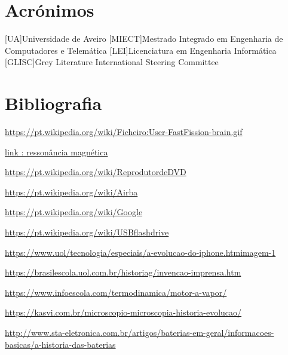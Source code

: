 \documentclass{report}
\begin{document}
\chapter*{Acrónimos}
\begin{acronym}
[UA]{Universidade de Aveiro}
[MIECT]{Mestrado Integrado em Engenharia de Computadores e Telemática}
[LEI]{Licenciatura em Engenharia Informática}
[GLISC]{Grey Literature International Steering Committee}
\end{acronym}


\chapter{Bibliografia}

\printbibliography

\href {https://pt.wikipedia.org/wiki/Ficheiro:User-FastFission-brain.gif}{https://pt.wikipedia.org/wiki/Ficheiro:User-FastFission-brain.gif}

\href {https://pt.wikipedia.org/wiki/Imagem_por_resson\%C3\%A2ncia_magn\%C3\%A9tica}{link : ressonância magnética}

\href {https://pt.wikipedia.org/wiki/Reprodutor_de_DVD}{https://pt.wikipedia.org/wiki/ReprodutordeDVD}

\href {https://pt.wikipedia.org/wiki/Airbag}{https://pt.wikipedia.org/wiki/Airba}

\href {https://pt.wikipedia.org/wiki/Google}{https://pt.wikipedia.org/wiki/Google}

\href {https://pt.wikipedia.org/wiki/USB_flash_drive}{https://pt.wikipedia.org/wiki/USBflashdrive}

\href {https://www.uol/tecnologia/especiais/a-evolucao-do-iphone.htm#imagem-1}{https://www.uol/tecnologia/especiais/a-evolucao-do-iphone.htmimagem-1}

\href {https://brasilescola.uol.com.br/historiag/invencao-imprensa.htm}{https://brasilescola.uol.com.br/historiag/invencao-imprensa.htm}

\href{https://www.infoescola.com/termodinamica/motor-a-vapor/}{https://www.infoescola.com/termodinamica/motor-a-vapor/}

\href{https://kasvi.com.br/microscopio-microscopia-historia-evolucao/}{https://kasvi.com.br/microscopio-microscopia-historia-evolucao/}

\href{http://www.sta-eletronica.com.br/artigos/baterias-em-geral/informacoes-basicas/a-historia-das-baterias}{http://www.sta-eletronica.com.br/artigos/baterias-em-geral/informacoes-basicas/a-historia-das-baterias}
\end{document}
